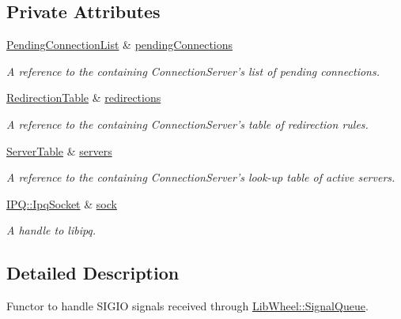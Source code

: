 \subsection*{\-Private \-Attributes}
\begin{DoxyCompactItemize}
\item 
\hyperlink{classNERD_1_1ConnectionServer_ac838d247f33cef856ae722343a8cb7ff}{\-Pending\-Connection\-List} \& \hyperlink{classNERD_1_1ConnectionServer_1_1ServerWritebackHandler_ab13916995c4c8ed9debb0ebac0cca091}{pending\-Connections}
\begin{DoxyCompactList}\small\item\em \-A reference to the containing \-Connection\-Server's list of pending connections. \end{DoxyCompactList}\item 
\hyperlink{classNERD_1_1ConnectionServer_a1f7b6abdda0f0a7a027a5f2e24727cee}{\-Redirection\-Table} \& \hyperlink{classNERD_1_1ConnectionServer_1_1ServerWritebackHandler_a436b00e74f3cab280212aea4c4068838}{redirections}
\begin{DoxyCompactList}\small\item\em \-A reference to the containing \-Connection\-Server's table of redirection rules. \end{DoxyCompactList}\item 
\hyperlink{classNERD_1_1ConnectionServer_a0cd661f2a6755c501ac198229675ad4d}{\-Server\-Table} \& \hyperlink{classNERD_1_1ConnectionServer_1_1ServerWritebackHandler_aa08d6aaad29ae5ece57c9f0623803e06}{servers}
\begin{DoxyCompactList}\small\item\em \-A reference to the containing \-Connection\-Server's look-\/up table of active servers. \end{DoxyCompactList}\item 
\hyperlink{classIPQ_1_1IpqSocket}{\-I\-P\-Q\-::\-Ipq\-Socket} \& \hyperlink{classNERD_1_1ConnectionServer_1_1ServerWritebackHandler_a452352f53ba0bf33d1a4be562bd1f490}{sock}
\begin{DoxyCompactList}\small\item\em \-A handle to libipq. \end{DoxyCompactList}\end{DoxyCompactItemize}


\subsection{\-Detailed \-Description}
\-Functor to handle \-S\-I\-G\-I\-O signals received through \hyperlink{classLibWheel_1_1SignalQueue}{\-Lib\-Wheel\-::\-Signal\-Queue}. 

